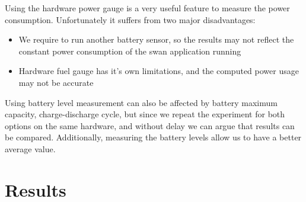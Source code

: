  Using the hardware power gauge is a very useful feature to measure the power consumption. Unfortunately it suffers from two major disadvantages:
 \begin{itemize}
  \item We require to run another battery sensor, so the results may not reflect the constant power consumption of the swan application running
  \item Hardware fuel gauge has it's own limitations, and the computed power usage may not be accurate
 \end{itemize}

 Using battery level measurement can also be affected by battery maximum capacity, charge-discharge cycle, but since we repeat the experiment for both options on the same hardware, and without delay we can argue that results can be compared.
 Additionally, measuring the battery levels allow us to have a better average value.
 \section{Results}
